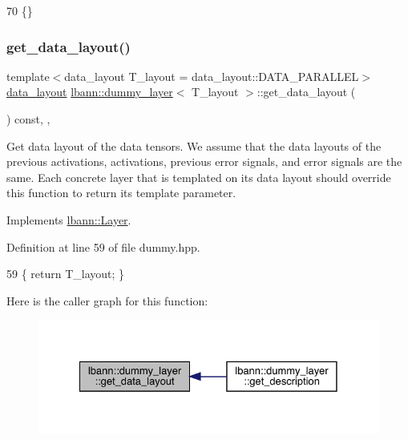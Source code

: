 \begin{DoxyCode}
70 \{\}
\end{DoxyCode}
\mbox{\label{classlbann_1_1dummy__layer_a3cc37758086f3c4824619504e4ee869b}} 
\subsubsection{\texorpdfstring{get\+\_\+data\+\_\+layout()}{get\_data\_layout()}}
{\footnotesize\ttfamily template$<$data\+\_\+layout T\+\_\+layout = data\+\_\+layout\+::\+D\+A\+T\+A\+\_\+\+P\+A\+R\+A\+L\+L\+EL$>$ \\
\hyperlink{base_8hpp_a786677cbfb3f5677b4d84f3056eb08db}{data\+\_\+layout} \hyperlink{classlbann_1_1dummy__layer}{lbann\+::dummy\+\_\+layer}$<$ T\+\_\+layout $>$\+::get\+\_\+data\+\_\+layout (\begin{DoxyParamCaption}{ }\end{DoxyParamCaption}) const\hspace{0.3cm}{\ttfamily [inline]}, {\ttfamily [override]}, {\ttfamily [virtual]}}

Get data layout of the data tensors. We assume that the data layouts of the previous activations, activations, previous error signals, and error signals are the same. Each concrete layer that is templated on its data layout should override this function to return its template parameter. 

Implements \hyperlink{classlbann_1_1Layer_a5dfb66e81fc085997402a5e2241316bd}{lbann\+::\+Layer}.



Definition at line 59 of file dummy.\+hpp.


\begin{DoxyCode}
59 \{ \textcolor{keywordflow}{return} T\_layout; \}
\end{DoxyCode}
Here is the caller graph for this function\+:\nopagebreak
\begin{figure}[H]
\begin{center}
\leavevmode
\includegraphics[width=328pt]{classlbann_1_1dummy__layer_a3cc37758086f3c4824619504e4ee869b_icgraph}
\end{center}
\end{figure}
\mbox{\label{classlbann_1_1dummy__layer_ab4921788ac99636ba95ba51aaa4394fe}} 
